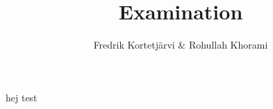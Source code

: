\documentclass{article}
\title{Examination}
\author{Fredrik Kortetjärvi \& Rohullah Khorami}
\begin{document}
\maketitle
hej test
\end{document}
